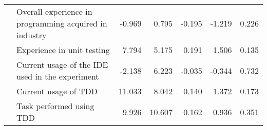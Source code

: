 \begin{table}[h]
{\begin{tabular}{|llrrrrr}
\multicolumn{1}{|l|}{}                                & \multicolumn{1}{l|}{Overall experience in programming acquired in industry}                         & \multicolumn{1}{r|}{-0.969}                  & \multicolumn{1}{r|}{0.795}                            & \multicolumn{1}{r|}{-0.195}                                                                        & \multicolumn{1}{r|}{-1.219}                      & \multicolumn{1}{r|}{0.226}                          \\ \cline{2-7} 
\multicolumn{1}{|l|}{}                                & \multicolumn{1}{l|}{Experience in unit testing}                                                     & \multicolumn{1}{r|}{7.794}                   & \multicolumn{1}{r|}{5.175}                            & \multicolumn{1}{r|}{0.191}                                                                         & \multicolumn{1}{r|}{1.506}                       & \multicolumn{1}{r|}{0.135}                          \\ \cline{2-7} 
\multicolumn{1}{|l|}{}                                & \multicolumn{1}{l|}{Current usage of the IDE used in the experiment}                                & \multicolumn{1}{r|}{-2.138}                  & \multicolumn{1}{r|}{6.223}                            & \multicolumn{1}{r|}{-0.035}                                                                        & \multicolumn{1}{r|}{-0.344}                      & \multicolumn{1}{r|}{0.732}                          \\ \cline{2-7} 
\multicolumn{1}{|l|}{}                                & \multicolumn{1}{l|}{Current usage of TDD}                                                           & \multicolumn{1}{r|}{11.033}                  & \multicolumn{1}{r|}{8.042}                            & \multicolumn{1}{r|}{0.140}                                                                         & \multicolumn{1}{r|}{1.372}                       & \multicolumn{1}{r|}{0.173}                          \\ \cline{2-7} 
\multicolumn{1}{|l|}{}                                & \multicolumn{1}{l|}{Task performed using TDD}                                                       & \multicolumn{1}{r|}{9.926}                   & \multicolumn{1}{r|}{10.607}                           & \multicolumn{1}{r|}{0.162}                                                                         & \multicolumn{1}{r|}{0.936}                       & \multicolumn{1}{r|}{0.351}                          \\ \cline{2-7} 

\end{tabular}}
\end{table}
